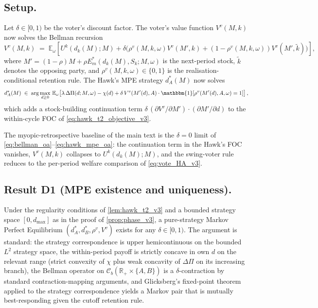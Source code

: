 \documentclass[11pt,twoside]{extarticle}
\begin{document}
\subsection*{Setup.} Let $\delta\in[0,1)$ be the voter's discount factor. The voter's value function $V^v(M,k)$ now solves the Bellman recursion
\begin{equation}\label{eq:bellman_oa}
    V^v(M,k)\;=\;\mathbb E_\omega\!\left[U^k(d_k(M);M)+\delta\big(\rho^v(M,k,\omega)V^v(M',k)+(1-\rho^v(M,k,\omega))V^v(M',\tilde k)\big)\right],
\end{equation}
where $M'=(1-\rho)M+\rho E_m^*(d_k(M),S_k;M,\omega)$ is the next-period stock, $\tilde k$ denotes the opposing party, and $\rho^v(M,k,\omega)\in\{0,1\}$ is the realisation-conditional retention rule. The Hawk's MPE strategy $d_A^*(M)$ now solves
\begin{equation}\label{eq:hawk_mpe_oa}
    d_A^*(M)\;\in\;\arg\max_{d\ge 0}\,\mathbb E_\omega\!\left[\lambda\,\Delta\Pi(d;M,\omega)-\chi(d)+\delta\,V^v(M'(d),A)\cdot\mathbbm{1}[\rho^v(M'(d),A,\omega)=1]\right],
\end{equation}
which adds a stock-building continuation term $\delta\,(\partial V^v/\partial M')\cdot(\partial M'/\partial d)$ to the within-cycle FOC of \eqref{eq:hawk_t2_objective_v3}.

The myopic-retrospective baseline of the main text is the $\delta=0$ limit of \eqref{eq:bellman_oa}--\eqref{eq:hawk_mpe_oa}: the continuation term in the Hawk's FOC vanishes, $V^v(M,k)$ collapses to $U^k(d_k(M);M)$, and the swing-voter rule reduces to the per-period welfare comparison of \eqref{eq:vote_HA_v3}.

\subsection*{Result D1 (MPE existence and uniqueness).} Under the regularity conditions of \autoref{lem:hawk_t2_v3} and a bounded strategy space $[0,d_{\max}]$ as in the proof of \autoref{prop:phase_v3}, a pure-strategy Markov Perfect Equilibrium $(d_A^*,d_B^*,\rho^v,V^v)$ exists for any $\delta\in[0,1)$. The argument is standard: the strategy correspondence is upper hemicontinuous on the bounded $L^2$ strategy space, the within-period payoff is strictly concave in own $d$ on the relevant range (strict convexity of $\chi$ plus weak concavity of $\Delta\Pi$ on its increasing branch), the Bellman operator on $\mathcal{C}_b(\mathbb R_+\times\{A,B\})$ is a $\delta$-contraction by standard contraction-mapping arguments, and Glicksberg's fixed-point theorem applied to the strategy correspondence yields a Markov pair that is mutually best-responding given the cutoff retention rule.
\end{document}
